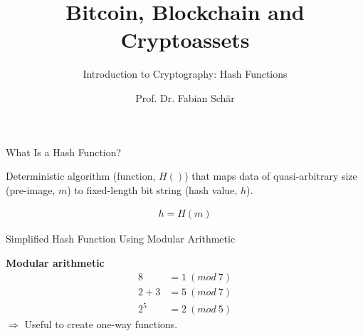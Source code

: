 \documentclass[]{beamer}
\title{Bitcoin, Blockchain and Cryptoassets}
\subtitle{Introduction to Cryptography: Hash Functions}
\author{Prof. Dr. Fabian Schär}
\institute{University of Basel}
\begin{document}
\thispagestyle{empty}
\begin{frame}[noframenumbering]
	\titlepage
\end{frame}

\begin{frame}{What Is a Hash Function?}

Deterministic algorithm (\color{focus}function, $H()$\color{black}) that maps data of quasi-arbitrary size (\color{focus}pre-image, $m$\color{black}) to fixed-length bit string (\color{focus}hash value, $h$\color{black}).

	\begin{align}
		h = H(m)
		\label{eq:hash_function}
	\end{align}

\vspace{1.5em}
	
	
\end{frame}


\begin{frame}{Simplified Hash Function Using Modular Arithmetic}
	\begin{minipage}[T]{0.65\textwidth}
	\textbf{Modular arithmetic}
				\begin{align*}
					8 &= 1\ (mod\ 7) \\
					2 + 3 &= 5\ (mod\ 7) \\
					2^5 &= 2\ (mod\ 5)
				\end{align*}
	$\Rightarrow$ Useful to create one-way functions.\\
	\end{minipage}
	\hfill
	\begin{minipage}[T]{0.3\textwidth}
		\begin{figure}[h!]
			\centering
			\resizebox{\linewidth}{!}{
			
			}
		\end{figure}
	\end{minipage}




\end{frame}
\end{document}
